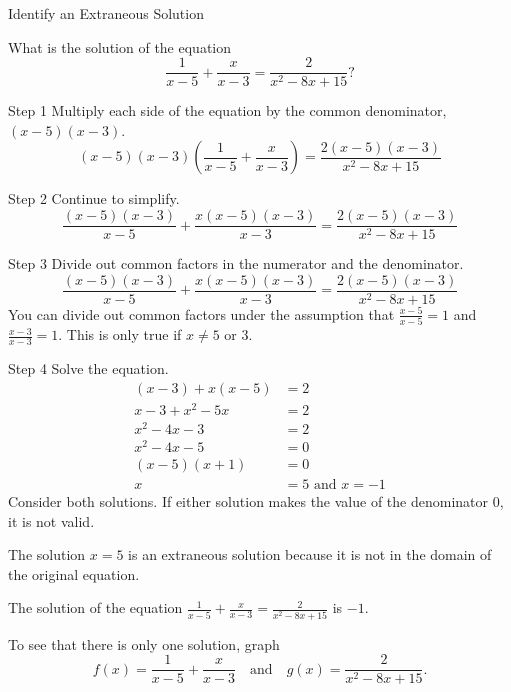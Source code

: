 \documentclass{article}
\newenvironment{example}[1]{}{}         %
\begin{document}
\begin{example}{3}
Identify an Extraneous Solution

What is the solution of the equation
\[
\frac{1}{x-5}+\frac{x}{x-3}=\frac{2}{x^2-8x+15}?
\]

Step 1 Multiply each side of the equation by the common denominator, $(x-5)(x-3)$.
\[
(x-5)(x-3)\left(\frac{1}{x-5}+\frac{x}{x-3}\right)=\frac{2(x-5)(x-3)}{x^2-8x+15}
\]

Step 2 Continue to simplify.
\[
\frac{(x-5)(x-3)}{x-5}+\frac{x(x-5)(x-3)}{x-3}=\frac{2(x-5)(x-3)}{x^2-8x+15}
\]

Step 3 Divide out common factors in the numerator and the denominator.
\[
\frac{(x-5)(x-3)}{x-5}+\frac{x(x-5)(x-3)}{x-3}=\frac{2(x-5)(x-3)}{x^2-8x+15}
\]
You can divide out common factors under the assumption that $\frac{x-5}{x-5}=1$ and $\frac{x-3}{x-3}=1$. This is only true if $x\neq5$ or 3.

Step 4 Solve the equation.
\begin{align*}
(x-3)+x(x-5) &= 2\\
x-3+x^2-5x &= 2\\
x^2-4x-3 &= 2\\
x^2-4x-5 &= 0\\
(x-5)(x+1) &= 0\\
x &= 5\text{ and }x=-1
\end{align*}
Consider both solutions. If either solution makes the value of the denominator 0, it is not valid.

The solution $x=5$ is an extraneous solution because it is not in the domain of the original equation.

The solution of the equation $\frac{1}{x-5}+\frac{x}{x-3}=\frac{2}{x^2-8x+15}$ is $-1$.

To see that there is only one solution, graph
\[
f(x)=\frac{1}{x-5}+\frac{x}{x-3}
\quad\text{and}\quad
 g(x)=\frac{2}{x^2-8x+15}.
\]


\end{example}
\end{document}

